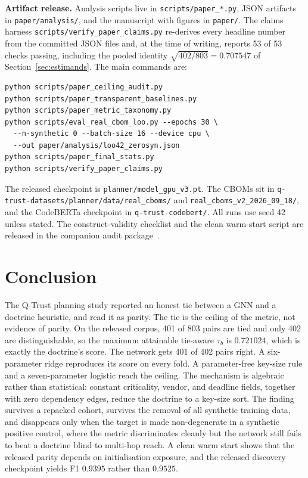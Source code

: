 \documentclass[journal,10pt]{IEEEtran}
\newcommand{\tb}{\tau_b}
\begin{document}
\textbf{Artifact release.} Analysis scripts live in \texttt{scripts/paper\_*.py}, JSON artifacts in
\texttt{paper/analysis/}, and the manuscript with figures in \texttt{paper/}. The claims harness
\texttt{scripts/verify\_paper\_claims.py} re-derives every headline number from the committed JSON
files and, at the time of writing, reports 53 of 53 checks passing, including the pooled identity
$\sqrt{402/803}=0.707547$ of Section~\ref{sec:estimands}. The main commands are:
\begin{verbatim}
python scripts/paper_ceiling_audit.py
python scripts/paper_transparent_baselines.py
python scripts/paper_metric_taxonomy.py
python scripts/eval_real_cbom_loo.py --epochs 30 \
  --n-synthetic 0 --batch-size 16 --device cpu \
  --out paper/analysis/loo42_zerosyn.json
python scripts/paper_final_stats.py
python scripts/verify_paper_claims.py
\end{verbatim}
The released checkpoint is \texttt{planner/model\_gpu\_v3.pt}. The CBOMs sit in
\texttt{q-trust-datasets/planner/data/real\_cboms/} and
\texttt{real\_cboms\_v2\_2026\_09\_18/}, and the CodeBERTa checkpoint in \texttt{q-trust-codebert/}.
All runs use seed 42 unless stated. The construct-validity checklist and the clean warm-start script
are released in the companion audit package~\cite{qtrust_validity_audit}.

\section{Conclusion}

The Q-Trust planning study reported an honest tie between a GNN and a doctrine heuristic, and read
it as parity. The tie is the ceiling of the metric, not evidence of parity. On the released corpus,
401 of 803 pairs are tied and only 402 are distinguishable, so the maximum attainable tie-aware
$\tb$ is $0.721024$, which is exactly the doctrine's score. The network gets 401 of 402 pairs right.
A six-parameter ridge reproduces its score on every fold. A parameter-free key-size rule and a
seven-parameter logistic reach the ceiling. The mechanism is algebraic rather than statistical:
constant criticality, vendor, and deadline fields, together with zero dependency edges, reduce the
doctrine to a key-size sort. The finding survives a repacked cohort, survives the removal of all
synthetic training data, and disappears only when the target is made non-degenerate in a synthetic
positive control, where the metric discriminates cleanly but the network still fails to beat a
doctrine blind to multi-hop reach. A clean warm start shows that the released parity depends on
initialisation exposure, and the released discovery checkpoint yields F1 $0.9395$ rather than
$0.9525$.
\end{document}
